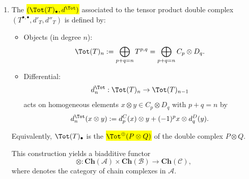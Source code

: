 \begin{definition}
\begin{enumerate}
    \item The  \hl{$(\Tot(T)_{\bullet}, d^{\Tot})$} associated to the tensor product double complex $(T^{\bullet,\bullet}, d'_T, d''_T)$ is defined by:
    \begin{itemize}
    \item Objects (in degree $n$):
    $$ \Tot(T)_n := \bigoplus_{p+q=n} T^{p,q} = \bigoplus_{p+q=n} C_p \otimes D_q.  $$
    \item Differential:
    $$ d^{\Tot}_n : \Tot(T)_n \to \Tot(T)_{n-1} $$
    acts on homogeneous elements $x \otimes y \in C_p \otimes D_q$ with $p+q=n$ by
    $$
    d^{\Tot}_n (x \otimes y) := d^C_p(x) \otimes y + (-1)^p x \otimes d^D_q(y).
    $$
    \end{itemize}
    Equivalently, $\Tot(T)_{\bullet}$ is the  \hl{$\Tot^{\oplus}(P \otimes Q)$} of the double complex $P \otimes Q$. 

    This construction yields a biadditive functor
    $$ \otimes : \mathbf{Ch}(\mathcal{A}) \times \mathbf{Ch}(\mathcal{B}) \to \mathbf{Ch}(\mathcal{C}), $$
    where  denotes the category of chain complexes in $\mathcal{A}$.
\end{enumerate}

\end{definition}